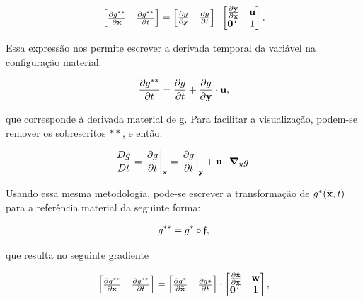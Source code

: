 \begin{align}
	\begin{bmatrix}
		\frac{\partial {g^{**}}}{\partial {\mathbf{x}}} & \frac{\partial {g^{**}}}{\partial t} \\
	\end{bmatrix}
	=
	\begin{bmatrix}
		\frac{\partial {g}}{\partial \mathbf{y}} & \frac{\partial {g}}{\partial t} 
	\end{bmatrix}
	\cdot
	\begin{bmatrix}
		\frac{\partial {\mathbf{y}}}{\partial {\mathbf{x}}} & \mathbf{u} \\
		\mathbf{0}^T & 1 \\
	\end{bmatrix} .
\end{align}

Essa expressão nos permite escrever a derivada temporal da variável na configuração material:

\begin{align}
	\frac{\partial g^{**}}{\partial t} = \frac{\partial g}{\partial t} + \frac{\partial g}{\partial \mathbf{y}} \cdot \mathbf{u}, 
\end{align}

\noindent que corresponde à derivada material de g. Para facilitar a visualização, podem-se remover os sobrescritos $**$, e então:

\begin{align}
	\frac{Dg}{Dt} = \left . \frac{\partial g}{\partial t} \right|_{\mathbf{x}} = \left . \frac{\partial g}{\partial t} \right|_{\mathbf{y}} + \mathbf{u} \cdot \boldsymbol{\nabla}_y g. \label{eq:der_mat}
\end{align}

Usando essa mesma metodologia, pode-se escrever a transformação de $g^{*}(\bar{\mathbf{x}},t)$ para a referência material da seguinte forma:

\begin{align}
	g^{**} = g^{*}  \circ \mathfrak{f},
\end{align}

\noindent que resulta no seguinte gradiente

\begin{align}
	\begin{bmatrix}
		\frac{\partial {g^{**}}}{\partial {\mathbf{x}}} & \frac{\partial {g^{**}}}{\partial t} \\
	\end{bmatrix}
	=
	\begin{bmatrix}
		\frac{\partial {g^*}}{\partial \bar{\mathbf{x}}} & \frac{\partial {g*}}{\partial t} 
	\end{bmatrix}
	\cdot
	\begin{bmatrix}
		\frac{\partial {\bar{\mathbf{x}}}}{\partial {\mathbf{x}}} & \mathbf{w} \\
		\mathbf{0}^T & 1 \\
	\end{bmatrix},
\end{align}

